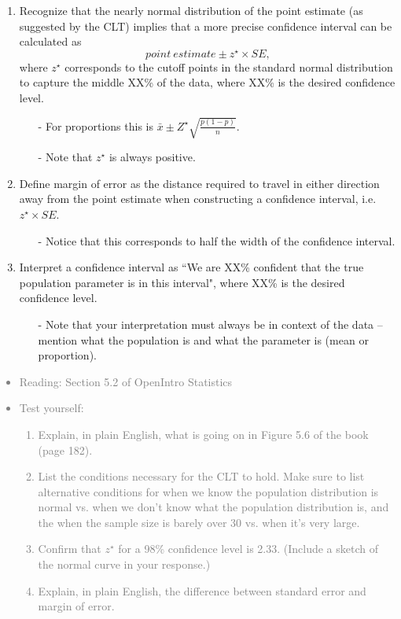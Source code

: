 \documentclass[11pt]{article}
\newcommand{\gray}[1]{\textcolor{gray}{#1}}
\begin{document}
\begin{enumerate}[resume]
\item Recognize that the nearly normal distribution of the point estimate (as suggested by the CLT) implies that a more precise confidence interval can be calculated as
\[ point~estimate \pm z^{\star} \times SE, \] 
where $z^{\star}$ corresponds to the cutoff points in the standard normal distribution to capture the middle XX\% of the data, where XX\% is the desired confidence level.
\begin{itemize}
\item[-] For proportions this is $\bar{x} \pm Z^\star \sqrt{\frac{p(1-p)}{n}}$.
\item[-] Note that $z^{\star}$ is always positive.
\end{itemize}

\item Define margin of error as the distance required to travel in either direction away from the point estimate when constructing a confidence interval, i.e. $z^{\star} \times SE$.
\begin{itemize}
\item[-] Notice that this corresponds to half the width of the confidence interval.
\end{itemize}

\item Interpret a confidence interval as ``We are XX\% confident that the true population parameter is in this interval", where XX\% is the desired confidence level.
\begin{itemize}
\item[-] Note that your interpretation must always be in context of the data -- mention what the population is and what the parameter is (mean or proportion).
\end{itemize}


\end{enumerate}

\gray{
{\it
\vspace{-0.5cm}
\begin{itemize}
\renewcommand{\labelitemi}{{\textcolor{dark}{$\ast$}}}
\item Reading: Section 5.2 of OpenIntro Statistics
\item Test yourself: 
{\small
\begin{enumerate}
\item Explain, in plain English, what is going on in Figure 5.6 of the book (page 182).
\item List the conditions necessary for the CLT to hold. Make sure to list alternative conditions for when we know the population distribution is normal vs. when we don't know what the population distribution is, and the when the sample size is barely over 30 vs. when it's very large.
\item Confirm that $z^{\star}$ for a 98\% confidence level is 2.33. (Include a sketch of the normal curve in your response.)
\item Explain, in plain English, the difference between standard error and margin of error.
\end{enumerate}
}
\end{itemize}
}}
\end{document}
